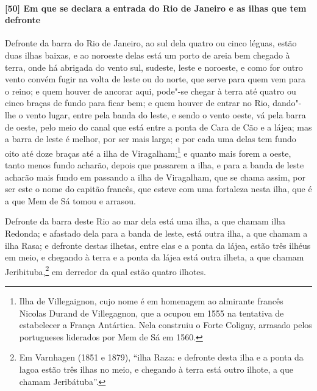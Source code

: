 \paragraph{[50] Em que se declara a entrada do Rio de Janeiro e as ilhas que tem defronte} \quad
Defronte da barra do Rio de Janeiro, ao sul dela quatro ou cinco léguas, estão duas ilhas
baixas, e ao noroeste delas está um porto de areia bem chegado à terra, onde há abrigada
do vento sul, sudeste, leste e noroeste, e como for outro vento convém fugir na volta de
leste ou do norte, que serve para quem vem para o reino; e quem houver de ancorar aqui,
pode"-se chegar à terra até quatro ou cinco braças de fundo para ficar bem; e quem houver
de entrar no Rio, dando"-lhe o vento lugar, entre pela banda do leste, e sendo o vento
oeste, vá pela barra de oeste, pelo meio do canal que está entre a ponta de Cara de Cão e
a lájea; mas a barra de leste é melhor, por ser mais larga; e por cada uma delas tem fundo
oito até doze braças até a ilha de Viragalham;\footnote{ Ilha de Villegaignon, cujo nome é
em homenagem ao almirante francês Nicolas Durand de Villegagnon, que a ocupou em 1555 na
tentativa de estabelecer a França Antártica. Nela construiu o Forte Coligny, arrasado
pelos portugueses liderados por Mem de Sá em 1560.} e quanto mais forem a oeste, tanto
menos fundo acharão, depois que passarem a ilha, e para a banda de leste acharão mais
fundo em passando a ilha de Viragalham, que se chama assim, por ser este o nome do capitão
francês, que esteve com uma fortaleza nesta ilha, que é a que Mem de Sá tomou e arrasou.

Defronte da barra deste Rio ao mar dela está uma ilha, a que chamam ilha Redonda; e
afastado dela para a banda de leste, está outra ilha, a que chamam a ilha Rasa; e defronte
destas ilhetas, entre elas e a ponta da lájea, estão três ilhéus em meio, e chegando à
terra e a ponta da lájea está outra ilheta, a que chamam Jeribituba,\footnote{ Em
Varnhagen (1851 e 1879), ``ilha Raza: e defronte desta ilha e a ponta da lagoa estão três
ilhas no meio, e chegando à terra está outro ilhote, a que chamam Jeribátuba''.} em
derredor da qual estão quatro ilhotes.

